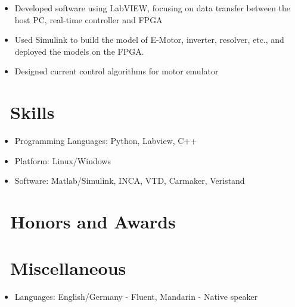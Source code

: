 \documentclass{resume}
\begin{document}


\begin{itemize}
  \item Developed software using LabVIEW, focusing on data transfer between the host PC, real-time controller and FPGA
  \item Used Simulink to build the model of E-Motor, inverter, resolver, etc., and deployed the models on the FPGA.
  \item Designed current control algorithms for motor emulator
\end{itemize}

\section{\faCogs\ Skills}
\begin{itemize}[parsep=0.5ex]
  \item Programming Languages: Python, Labview, C++
  \item Platform: Linux/Windows
  \item Software: Matlab/Simulink, INCA, VTD, Carmaker, Veristand 
\end{itemize}

\section{\faHeartO\ Honors and Awards}

\section{\faInfo\ Miscellaneous}
\begin{itemize}[parsep=0.5ex]
  \item Languages: English/Germany - Fluent, Mandarin - Native speaker
\end{itemize}

%
%
\end{document}
